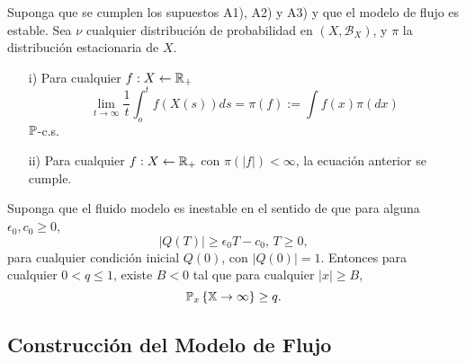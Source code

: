 \begin{Teo}\label{Tma.6.4.DaiSean}
Suponga que se cumplen los supuestos A1), A2) y A3) y que el
modelo de flujo es estable. Sea $\nu$ cualquier distribuci\'on de
probabilidad en $\left(X,\mathcal{B}_{X}\right)$, y $\pi$ la
distribuci\'on estacionaria de $X$.
\begin{itemize}
\item[i)] Para cualquier $f:X\leftarrow\mathbb{R}_{+}$
\begin{equation}
\lim_{t\rightarrow\infty}\frac{1}{t}\int_{o}^{t}f\left(X\left(s\right)\right)ds=\pi\left(f\right):=\int
f\left(x\right)\pi\left(dx\right)
\end{equation}
$\mathbb{P}$-c.s.

\item[ii)] Para cualquier $f:X\leftarrow\mathbb{R}_{+}$ con
$\pi\left(|f|\right)<\infty$, la ecuaci\'on anterior se cumple.
\end{itemize}
\end{Teo}

\begin{Teo}\label{Tma2.2.Down}
Suponga que el fluido modelo es inestable en el sentido de que
para alguna $\epsilon_{0},c_{0}\geq0$,
\begin{equation}\label{Eq.Inestability}
|Q\left(T\right)|\geq\epsilon_{0}T-c_{0}\textrm{,   }T\geq0,
\end{equation}
para cualquier condici\'on inicial $Q\left(0\right)$, con
$|Q\left(0\right)|=1$. Entonces para cualquier $0<q\leq1$, existe
$B<0$ tal que para cualquier $|x|\geq B$,
\begin{equation}
\mathbb{P}_{x}\left\{\mathbb{X}\rightarrow\infty\right\}\geq q.
\end{equation}
\end{Teo}



\subsection{Construcci\'on del Modelo de Flujo}


